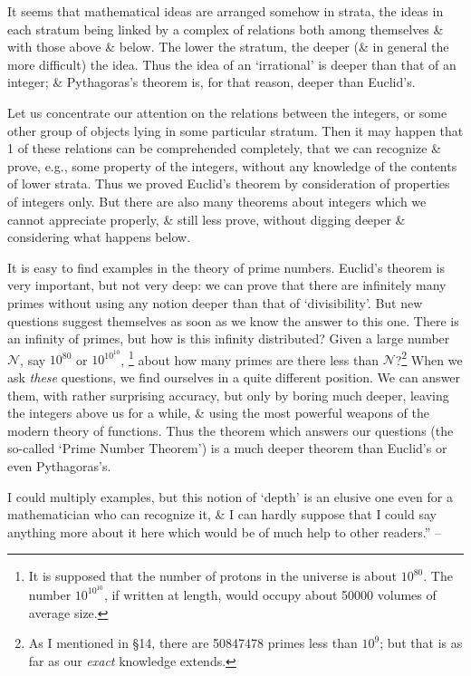 \documentclass{article}
\numberwithin{equation}{section}
\begin{document}
It seems that mathematical ideas are arranged somehow in strata, the ideas in each stratum being linked by a complex of relations both among themselves \& with those above \& below. The lower the stratum, the deeper (\& in general the more difficult) the idea. Thus the idea of an `irrational' is deeper than that of an integer; \& Pythagoras's theorem is, for that reason, deeper than Euclid's.

Let us concentrate our attention on the relations between the integers, or some other group of objects lying in some particular stratum. Then it may happen that 1 of these relations can be comprehended completely, that we can recognize \& prove, e.g., some property of the integers, without any knowledge of the contents of lower strata. Thus we proved Euclid's theorem by consideration of properties of integers only. But there are also many theorems about integers which we cannot appreciate properly, \& still less prove, without digging deeper \& considering what happens below.

It is easy to find examples in the theory of prime numbers. Euclid's theorem is very important, but not very deep: we can prove that there are infinitely many primes without using any notion deeper than that of `divisibility'. But new questions suggest themselves as soon as we know the answer to this one. There is an infinity of primes, but how is this infinity distributed? Given a large number $\mathcal{N}$, say $10^{80}$ or $10^{10^{10}}$, \footnote{It is supposed that the number of protons in the universe is about $10^{80}$. The number $10^{10^{10}}$, if written at length, would occupy about 50000 volumes of average size.} about how many primes are there less than $\mathcal{N}$?\footnote{As I mentioned in \S14, there are 50847478 primes less than $10^9$; but that is as far as our \textit{exact} knowledge extends.} When we ask \textit{these} questions, we find ourselves in a quite different position. We can answer them, with rather surprising accuracy, but only by boring much deeper, leaving the integers above us for a while, \& using the most powerful weapons of the modern theory of functions. Thus the theorem which answers our questions (the so-called `Prime Number Theorem') is a much deeper theorem than Euclid's or even Pythagoras's.

I could multiply examples, but this notion of `depth' is an elusive one even for a mathematician who can recognize it, \& I can hardly suppose that I could say anything more about it here which would be of much help to other readers.'' -- \cite[pp. 109--112]{Hardy1992}
\end{document}
